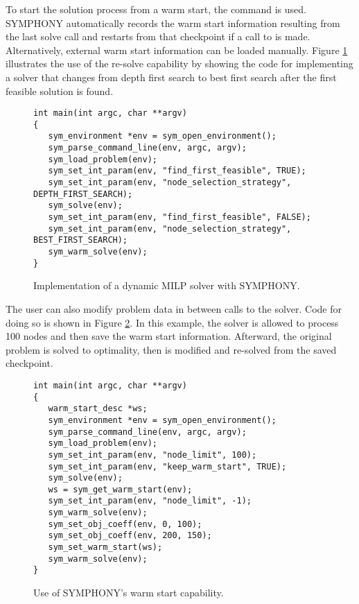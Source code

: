 To start the solution process from a warm start, the 
command is used. SYMPHONY automatically records the warm start information
resulting from the last solve call and restarts from that checkpoint if a call
to  is made. Alternatively, external warm start
information can be loaded manually. Figure \ref{dynamic} illustrates the use
of the re-solve capability by showing the code for implementing a solver that
changes from depth first search to best first search after the first feasible
solution is found.
\begin{figure}[tb]
{\color{Brown}
\begin{Verbatim}[frame=lines]
int main(int argc, char **argv)
{
   sym_environment *env = sym_open_environment();
   sym_parse_command_line(env, argc, argv);
   sym_load_problem(env);
   sym_set_int_param(env, "find_first_feasible", TRUE);
   sym_set_int_param(env, "node_selection_strategy", DEPTH_FIRST_SEARCH);
   sym_solve(env);
   sym_set_int_param(env, "find_first_feasible", FALSE);
   sym_set_int_param(env, "node_selection_strategy", BEST_FIRST_SEARCH);
   sym_warm_solve(env);
}
\end{Verbatim}
}
\caption{Implementation of a dynamic MILP solver with SYMPHONY. 
\label{dynamic}}
\end{figure}
The user can also modify problem data in between calls to the solver. Code for
doing so is shown in Figure \ref{warm_start}. In this example, the
solver is allowed to process 100 nodes and then save the warm start
information. Afterward, the original problem is solved to optimality, then is
modified and re-solved from the saved checkpoint. 
\begin{figure}[tb]
{\color{Brown}
\begin{Verbatim}[frame=lines]
int main(int argc, char **argv)
{
   warm_start_desc *ws;
   sym_environment *env = sym_open_environment();
   sym_parse_command_line(env, argc, argv);
   sym_load_problem(env);
   sym_set_int_param(env, "node_limit", 100);
   sym_set_int_param(env, "keep_warm_start", TRUE);
   sym_solve(env);
   ws = sym_get_warm_start(env);
   sym_set_int_param(env, "node_limit", -1);
   sym_warm_solve(env);
   sym_set_obj_coeff(env, 0, 100);
   sym_set_obj_coeff(env, 200, 150);
   sym_set_warm_start(ws);
   sym_warm_solve(env);
}
\end{Verbatim}
}
\caption{Use of SYMPHONY's warm start capability. \label{warm_start}}
\end{figure}

